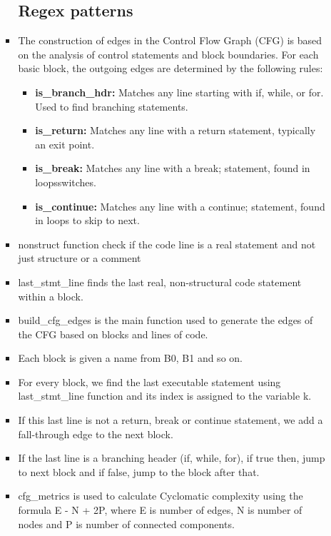 \documentclass[12pt, a4paper]{report}
\begin{document}
\begin{itemize}
\begin{itemize}
\begin{itemize}
                \subsection{Regex patterns}

                \item The construction of edges in the Control Flow Graph (CFG) is based on the analysis of control statements and block boundaries. For each basic block, the outgoing edges are determined by the following rules:

                \begin{itemize}
                    \item \textbf{is\_branch\_hdr:} Matches any line starting with if, while, or for. Used to find branching statements.
                    \item \textbf{is\_return:} Matches any line with a return statement, typically an exit point.
                    \item \textbf{is\_break:} Matches any line with a break; statement, found in loops\/switches.
                    \item \textbf{is\_continue:} Matches any line with a continue; statement, found in loops to skip to next.
                \end{itemize}
                \item nonstruct function check if the code line is a real statement and not just structure or a comment
                \item last\_stmt\_line finds the last real, non-structural code statement within a block.
                \item build\_cfg\_edges is the main function used to generate the edges of the CFG based on blocks and lines of code.
                \item Each block is given a name from B0, B1 and so on.
                \item For every block, we find the last executable statement using last\_stmt\_line function and its index is assigned to the variable k.
                \item If this last line is not a return, break or continue statement, we add a fall-through edge to the next block. 
                \item If the last line is a branching header (if, while, for), if true then, jump to next block and if false, jump to the block after that.
                \item cfg\_metrics is used to calculate Cyclomatic complexity using the formula E - N + 2P, where E is number of edges, N is number of nodes and P is number of connected components.
            \end{itemize}
        \end{itemize}



\end{itemize}
\end{document}
